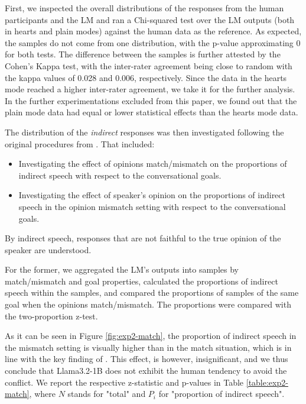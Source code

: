 \documentclass[11pt]{article}
\begin{document}
First, we inspected the overall distributions of the responses from the human participants and the LM and ran a Chi-squared test over the LM outputs (both in hearts and plain modes) against the human data as the reference. As expected, the samples do not come from one distribution, with the p-value approximating $0$ for both tests. The difference between the samples is further attested by the Cohen's Kappa test, with the inter-rater agreement being close to random with the kappa values of 0.028 and 0.006, respectively. Since the data in the hearts mode reached a higher inter-rater agreement, we take it for the further analysis. In the further experimentations excluded from this paper, we found out that the plain mode data had equal or lower statistical effects than the hearts mode data.

The distribution of the \textit{indirect} responses was then investigated following the original procedures from \citet{achimova-2025}. That included:

\begin{itemize}
    \item Investigating the effect of opinions match/mismatch on the proportions of indirect speech with respect to the conversational goals.
    \item Investigating the effect of speaker's opinion on the proportions of indirect speech in the opinion mismatch setting with respect to the conversational goals.
\end{itemize}

By indirect speech, responses that are not faithful to the true opinion of the speaker are understood.

For the former, we aggregated the LM's outputs into samples by match/mismatch and goal properties, calculated the proportions of indirect speech within the samples, and compared the proportions of samples of the same goal when the opinions match/mismatch. The proportions were compared with the two-proportion z-test.

As it can be seen in Figure \ref{fig:exp2-match}, the proportion of indirect speech in the mismatch setting is visually higher than in the match situation, which is in line with the key finding of \citet{achimova-2025}. This effect, is however, insignificant, and we thus conclude that Llama3.2-1B does not exhibit the human tendency to avoid the conflict. We report the respective z-statistic and p-values in Table \ref{table:exp2-match}, where $N$ stands for "total" and $P_i$ for "proportion of indirect speech".
\end{document}
